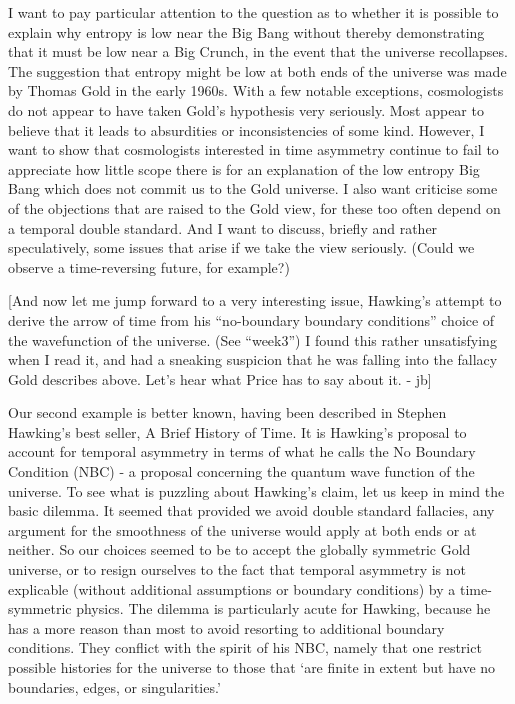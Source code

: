 \documentclass{article}
\begin{document}
I want to pay particular attention to the question as to whether it is
possible to explain why entropy is low near the Big Bang without thereby
demonstrating that it must be low near a Big Crunch, in the event that
the universe recollapses. The suggestion that entropy might be low at
both ends of the universe was made by Thomas Gold in the early 1960s.
With a few notable exceptions, cosmologists do not appear to have taken
Gold's hypothesis very seriously. Most appear to believe that it leads
to absurdities or inconsistencies of some kind. However, I want to show
that cosmologists interested in time asymmetry continue to fail to
appreciate how little scope there is for an explanation of the low
entropy Big Bang which does not commit us to the Gold universe. I also
want criticise some of the objections that are raised to the Gold view,
for these too often depend on a temporal double standard. And I want to
discuss, briefly and rather speculatively, some issues that arise if we
take the view seriously. (Could we observe a time-reversing future, for
example?)

{[}And now let me jump forward to a very interesting issue, Hawking's
attempt to derive the arrow of time from his ``no-boundary boundary
conditions'' choice of the wavefunction of the universe. (See ``week3'')
I found this rather unsatisfying when I read it, and had a sneaking
suspicion that he was falling into the fallacy Gold describes above.
Let's hear what Price has to say about it. - jb{]}

Our second example is better known, having been described in Stephen
Hawking's best seller, A Brief History of Time. It is Hawking's proposal
to account for temporal asymmetry in terms of what he calls the No
Boundary Condition (NBC) - a proposal concerning the quantum wave
function of the universe. To see what is puzzling about Hawking's claim,
let us keep in mind the basic dilemma. It seemed that provided we avoid
double standard fallacies, any argument for the smoothness of the
universe would apply at both ends or at neither. So our choices seemed
to be to accept the globally symmetric Gold universe, or to resign
ourselves to the fact that temporal asymmetry is not explicable (without
additional assumptions or boundary conditions) by a time-symmetric
physics. The dilemma is particularly acute for Hawking, because he has a
more reason than most to avoid resorting to additional boundary
conditions. They conflict with the spirit of his NBC, namely that one
restrict possible histories for the universe to those that `are finite
in extent but have no boundaries, edges, or singularities.'
\end{document}
